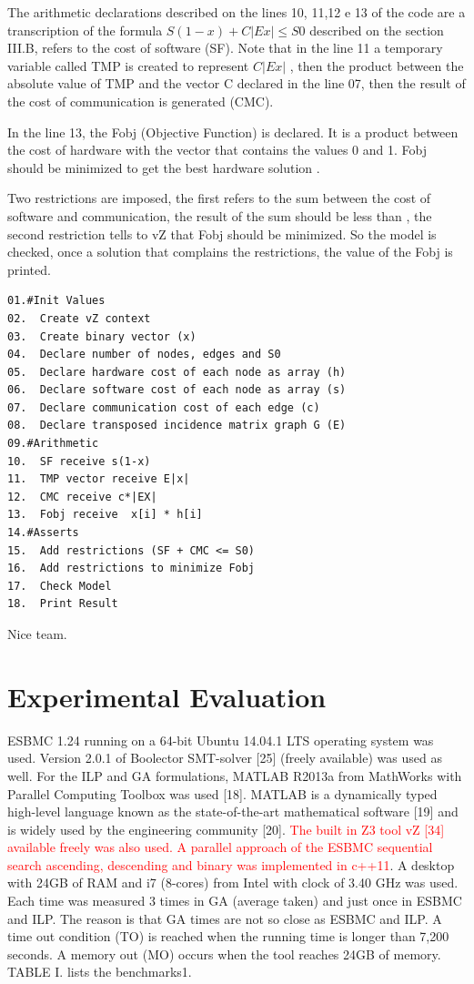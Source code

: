 The arithmetic declarations described on the lines 10, 11,12 e 13 of the code are a transcription of the formula $ S(1-x) + C|Ex| \leq S{0} $ described on the section III.B, refers to the cost of software (SF). Note that in the line 11 a temporary variable called TMP is created to represent $C|Ex|$  , then the product between the absolute value of TMP and the vector C declared in the line 07, then the result of the cost of communication is generated (CMC). 

In the line 13, the Fobj (Objective Function) is declared. It is a product between the cost of hardware with the vector that contains the values 0 and 1. Fobj should be minimized to get the best hardware solution .

Two restrictions are imposed, the first refers to the sum between the cost of software and communication, the result of the sum should be less than , the second restriction tells to vZ that Fobj should be minimized. So the model is checked, once a solution that complains the restrictions, the value of the Fobj is printed.

\begin{lstlisting}
01.#Init Values
02.  Create vZ context 
03.  Create binary vector (x)
04.  Declare number of nodes, edges and S0
05.  Declare hardware cost of each node as array (h) 
06.  Declare software cost of each node as array (s)
07.  Declare communication cost of each edge (c)
08.  Declare transposed incidence matrix graph G (E)
09.#Arithmetic
10.  SF receive s(1-x)
11.  TMP vector receive E|x| 
12.  CMC receive c*|EX|
13.  Fobj receive  x[i] * h[i]
14.#Asserts
15.  Add restrictions (SF + CMC <= S0)
16.  Add restrictions to minimize Fobj
17.  Check Model
18.  Print Result
\end{lstlisting}

Nice team.

\section{Experimental Evaluation}

ESBMC 1.24 running on a 64-bit Ubuntu 14.04.1 LTS operating system was used. Version 2.0.1 of Boolector SMT-solver [25] (freely available) was used as well. For the ILP and GA formulations, MATLAB R2013a from MathWorks with Parallel Computing Toolbox was used [18]. MATLAB is a dynamically typed high-level language known as the state-of-the-art mathematical software [19] and is widely used by the engineering community [20]. \textcolor{Red}{The built in Z3 tool vZ [34] available freely was also used. A parallel approach of the ESBMC sequential search ascending, descending and binary was implemented in c++11}. A desktop with 24GB of RAM and i7 (8-cores) from Intel with clock of 3.40 GHz was used. Each time was measured 3 times in GA (average taken) and just once in ESBMC and ILP. The reason is that GA times are not so close as ESBMC and ILP. A time out condition (TO) is reached when the running time is longer than 7,200 seconds. A memory out (MO) occurs when the tool reaches 24GB of memory. TABLE I. lists the benchmarks1.

